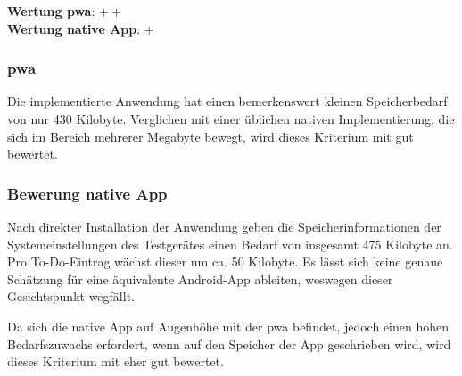 \textbf{Wertung \ac{pwa}}: $++$ \\
\textbf{Wertung native App}: $+$ \\

\subsubsection{\ac{pwa}}
Die implementierte Anwendung hat einen bemerkenswert kleinen Speicherbedarf von  nur 430 Kilobyte. Verglichen mit einer üblichen nativen Implementierung, die sich im Bereich mehrerer Megabyte bewegt, wird dieses Kriterium mit gut bewertet.

\subsubsection{Bewerung native App}
Nach direkter Installation der Anwendung geben die Speicherinformationen der Systemeinstellungen des Testgerätes einen Bedarf von insgesamt 475 Kilobyte an. Pro To-Do-Eintrag wächst dieser um ca. 50 Kilobyte. Es lässt sich keine genaue Schätzung für eine äquivalente Android-App ableiten, weswegen dieser Gesichtspunkt wegfällt.

Da sich die native App auf Augenhöhe mit der \ac{pwa} befindet, jedoch einen hohen Bedarfszuwachs erfordert, wenn auf den Speicher der App geschrieben wird, wird dieses Kriterium mit eher gut bewertet.